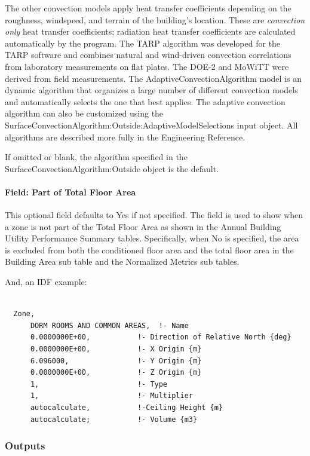 The other convection models apply heat transfer coefficients depending on the roughness, windspeed, and terrain of the building's location. These are \emph{convection only} heat transfer coefficients; radiation heat transfer coefficients are calculated automatically by the program. The TARP algorithm was developed for the TARP software and combines natural and wind-driven convection correlations from laboratory measurements on flat plates. The DOE-2 and MoWiTT were derived from field measurements. The AdaptiveConvectionAlgorithm model is an dynamic algorithm that organizes a large number of different convection models and automatically selects the one that best applies. The adaptive convection algorithm can also be customized using the SurfaceConvectionAlgorithm:Outside:AdaptiveModelSelections input object. All algorithms are described more fully in the Engineering Reference.

If omitted or blank, the algorithm specified in the SurfaceConvectionAlgorithm:Outside object is the default.

\paragraph{Field: Part of Total Floor Area}\label{field-part-of-total-floor-area}

This optional field defaults to Yes if not specified. The field is used to show when a zone is not part of the Total Floor Area as shown in the Annual Building Utility Performance Summary tables. Specifically, when No is specified, the area is excluded from both the conditioned floor area and the total floor area in the Building Area sub table and the Normalized Metrics sub tables.

And, an IDF example:

\begin{lstlisting}

  Zone,
      DORM ROOMS AND COMMON AREAS,  !- Name
      0.0000000E+00,           !- Direction of Relative North {deg}
      0.0000000E+00,           !- X Origin {m}
      6.096000,                !- Y Origin {m}
      0.0000000E+00,           !- Z Origin {m}
      1,                       !- Type
      1,                       !- Multiplier
      autocalculate,           !-Ceiling Height {m}
      autocalculate;           !- Volume {m3}
\end{lstlisting}

\subsubsection{Outputs}\label{outputs-037}

